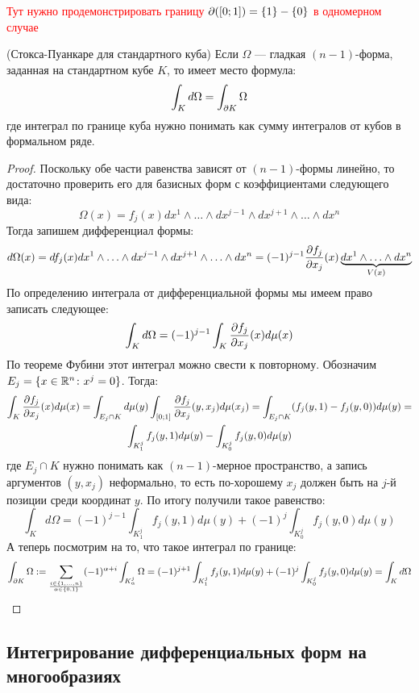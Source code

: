\textcolor{red}{Тут нужно продемонстрировать границу $\partial([0; 1]) = \{1\} - \{0\}$ в одномерном случае}

\begin{theorem} (Стокса-Пуанкаре для стандартного куба)
	Если $\Omega$ --- гладкая $(n - 1)$-форма, заданная на стандартном кубе $K$, то имеет место формула:
	\[
		\int_K d\Omega = \int_{\partial K} \Omega
	\]
	где интеграл по границе куба нужно понимать как сумму интегралов от кубов в формальном ряде.
\end{theorem}

\begin{proof}
	Поскольку обе части равенства зависят от $(n - 1)$-формы линейно, то достаточно проверить его для базисных форм с коэффициентами следующего вида:
	\[
		\Omega(x) = f_j(x) dx^1 \wedge \ldots \wedge dx^{j - 1} \wedge dx^{j + 1} \wedge \ldots \wedge dx^n
	\]
	Тогда запишем дифференциал формы:
	\[
		d\Omega(x) = df_j(x)dx^1 \wedge \ldots \wedge dx^{j - 1} \wedge dx^{j + 1} \wedge \ldots \wedge dx^n = (-1)^{j - 1}\frac{\partial f_j}{\partial x_j}(x) \underbrace{dx^1 \wedge \ldots \wedge dx^n}_{V(x)}
	\]
	По определению интеграла от дифференциальной формы мы имеем право записать следующее:
	\[
		\int_K d\Omega = (-1)^{j - 1}\int_K \frac{\partial f_j}{\partial x_j}(x)d\mu(x)
	\]
	По теореме Фубини этот интеграл можно свести к повторному. Обозначим $E_j = \{x \in \mathbb{R}^n \colon x^j = 0\}$. Тогда:
	\begin{multline*}
		\int_K \frac{\partial f_j}{\partial x_j}(x)d\mu(x) = \int_{E_j \cap K} d\mu(y) \int_{[0; 1]} \frac{\partial f_j}{\partial x_j} (y, x_j) d\mu(x_j) = \int_{E_j \cap K} (f_j(y, 1) - f_j(y, 0))d\mu(y) =
		\\
		\int_{K_1^j} f_j(y, 1)d\mu(y) - \int_{K_0^j} f_j(y, 0)d\mu(y)
	\end{multline*}
	где $E_j \cap K$ нужно понимать как $(n - 1)$-мерное пространство, а запись аргументов $(y, x_j)$ неформально, то есть по-хорошему $x_j$ должен быть на $j$-й позиции среди координат $y$. По итогу получили такое равенство:
	\[
		\int_K d\Omega = (-1)^{j - 1}\int_{K_1^j} f_j(y, 1)d\mu(y) + (-1)^j \int_{K_0^j} f_j(y, 0)d\mu(y)
	\]
	А теперь посмотрим на то, что такое интеграл по границе:
	\[
		\int_{\partial K} \Omega := \sum_{i \in \{1, \ldots, n\} \over {\alpha \in \{0, 1\}}} (-1)^{\alpha + i} \int_{K_\alpha^j} \Omega = (-1)^{j + 1} \int_{K_1^j} f_j(y, 1)d\mu(y) + (-1)^j \int_{K_0^j} f_j(y, 0)d\mu(y) = \int_K d\Omega
	\]
\end{proof}

\subsection{Интегрирование дифференциальных форм на многообразиях}

